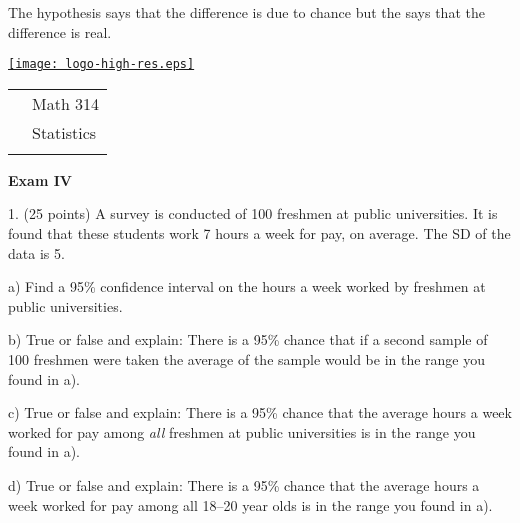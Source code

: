 \documentclass[10pt]{article}
\begin{document}
The \underline{\hspace{60pt}} hypothesis says that the difference is due to chance
but the \underline{\hspace{60pt}} says that the difference is real.  
\vfill
\eject

\href{http://www.shepherd.edu}{\texttt{[image: logo-high-res.eps]}}
\vspace{-1.69cm}

{\small
\begin{tabular}{cl}
& Math 314\\
& Statistics\\
\hspace{5.28in} & %
\end{tabular}
}
\setlength{\baselineskip}{1.05\baselineskip}

\begin{center}
\textbf{\large  Exam IV}
\end{center}
\medskip

1. (25 points) A survey is conducted of 100 freshmen at public universities.
It is found that these students work 7 hours a week for pay, 
on average.  The SD of the data is 5.  

\hspace{20pt} a) Find a 95\% confidence interval
on the  hours  a week worked by freshmen at public universities.
\vspace{2.5in}

\hspace{20pt} b) True or false and explain:  There is a 95\% chance that
if a second sample of 100 freshmen were taken
the average of the sample would be in the range you found in a).
\vspace{1.5in}

\hspace{20pt} c) True or false and explain:  There is a 95\% chance that the
average hours a week worked for pay among \textit{all} freshmen at public universities
is in the range you found in a).
\vspace{1.5in}

\hspace{20pt} d) True or false and explain:  There is a 95\% chance that the
average hours a week worked for pay among all 18--20 year olds
is in the range you found in a).
\vspace{1in}
\vfill
\eject
{\ }
\end{document}
